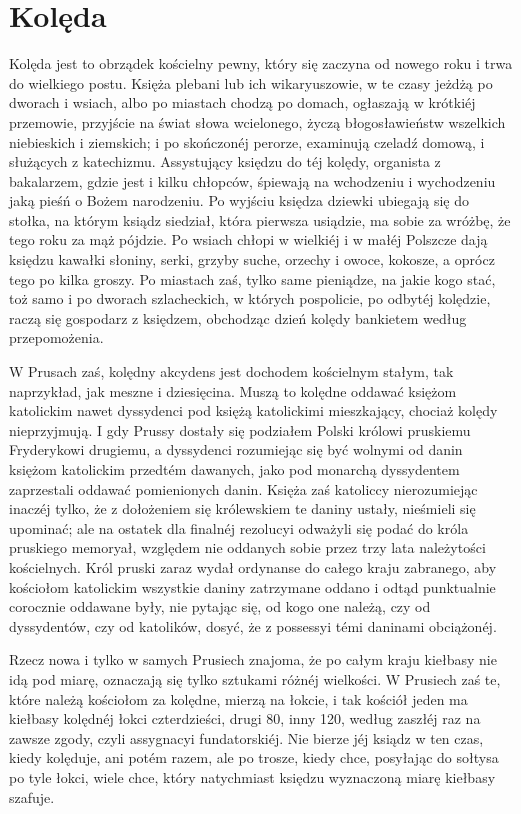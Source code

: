 \documentclass{book}
\begin{document}
\section{Kolęda}

Kolęda jest to obrządek kościelny pewny, który się zaczyna od nowego roku i trwa do wielkiego postu. Księża plebani lub ich wikaryuszowie, w te czasy jeżdżą po dworach i wsiach, albo po miastach chodzą po domach, ogłaszają w krótkiéj przemowie, przyjście na świat słowa wcielonego, życzą błogosławieństw wszelkich niebieskich i ziemskich; i po skończonéj perorze, examinują czeladź domową, i służących z katechizmu. Assystujący księdzu do téj kolędy, organista z bakalarzem, gdzie jest i kilku chłopców, śpiewają na wchodzeniu i wychodzeniu jaką pieśń o Bożem narodzeniu. Po wyjściu księdza dziewki ubiegają się do stołka, na którym ksiądz siedział, która pierwsza usiądzie, ma sobie za wróżbę, że tego roku za mąż pójdzie. Po wsiach chłopi w wielkiéj i w małéj Polszcze dają księdzu kawałki słoniny, serki, grzyby suche, orzechy i owoce, kokosze, a oprócz tego po kilka groszy. Po miastach zaś, tylko same pieniądze, na jakie kogo stać, toż samo i po dworach szlacheckich, w których pospolicie, po odbytéj kolędzie, raczą się gospodarz z księdzem, obchodząc dzień kolędy bankietem według przepomożenia.

W Prusach zaś, kolędny akcydens jest dochodem kościelnym stałym, tak naprzykład, jak meszne i dziesięcina. Muszą to kolędne oddawać księżom katolickim nawet dyssydenci pod księżą katolickimi mieszkający, chociaż kolędy nieprzyjmują. I gdy Prussy dostały się podziałem Polski królowi pruskiemu Fryderykowi drugiemu, a dyssydenci rozumiejąc się być wolnymi od danin księżom katolickim przedtém dawanych, jako pod monarchą dyssydentem zaprzestali oddawać pomienionych danin. Księża zaś katoliccy nierozumiejąc inaczéj tylko, że z dołożeniem się królewskiem te daniny ustały, nieśmieli się upominać; ale na ostatek dla finalnéj rezolucyi odważyli się podać do króla pruskiego memoryał, względem nie oddanych sobie przez trzy lata należytości kościelnych. Król pruski zaraz wydał ordynanse do całego kraju zabranego, aby kościołom katolickim wszystkie daniny zatrzymane oddano i odtąd punktualnie corocznie oddawane były, nie pytając się, od kogo one należą, czy od dyssydentów, czy od katolików, dosyć, że z possessyi témi daninami obciążonéj.

Rzecz nowa i tylko w samych Prusiech znajoma, że po całym kraju kiełbasy nie idą pod miarę, oznaczają się tylko sztukami różnéj wielkości. W Prusiech zaś te, które należą kościołom za kolędne, mierzą na łokcie, i tak kościół jeden ma kiełbasy kolędnéj łokci czterdzieści, drugi 80, inny 120, według zaszłéj raz na zawsze zgody, czyli assygnacyi fundatorskiéj. Nie bierze jéj ksiądz w ten czas, kiedy kolęduje, ani potém razem, ale po trosze, kiedy chce, posyłając do sołtysa po tyle łokci, wiele chce, który natychmiast księdzu wyznaczoną miarę kiełbasy szafuje.
\end{document}
